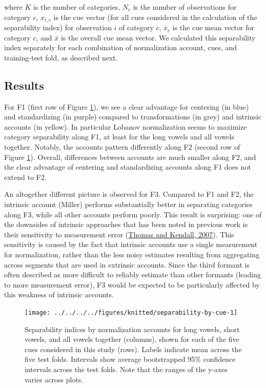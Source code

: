 \documentclass[utf8]{frontiers_suppmat} %
\begin{document}
where \(K\) is the number of categories, \(N_c\) is the number of observations for category \(c\), \(x_{i,c}\) is the cue vector (for all cues considered in the calculation of the separability index) for observation \(i\) of category \(c\), \(\bar{x}_c\) is the cue mean vector for category \(c\), and \(\bar{x}\) is the overall cue mean vector. We calculated this separability index separately for each combination of normalization account, cues, and training-test fold, as described next.


\hypertarget{sec:resultsI}{%
\subsection{Results}\label{sec:resultsI}}

For F1 (first row of Figure \ref{fig:separability-by-cue}), we see a clear advantage for centering (in blue) and standardizing (in purple) compared to transformations (in grey) and intrinsic accounts (in yellow). In particular Lobanov normalization seems to maximize category separability along F1, at least for the long vowels and all vowels together. Notably, the accounts pattern differently along F2 (second row of Figure \ref{fig:separability-by-cue}). Overall, differences between accounts are much smaller along F2, and the clear advantage of centering and standardizing accounts along F1 does not extend to F2.

An altogether different picture is observed for F3. Compared to F1 and F2, the intrinsic account (Miller) performs substantially better in separating categories along F3, while all other accounts perform poorly. This result is surprising: one of the downsides of intrinsic approaches that has been noted in previous work is their sensitivity to measurement error (\protect\hyperlink{ref-thomas2007}{Thomas and Kendall, 2007}). This sensitivity is caused by the fact that intrinsic accounts use a single measurement for normalization, rather than the less noisy estimates resulting from aggregating across segments that are used in extrinsic accounts. Since the third formant is often described as more difficult to reliably estimate than other formants (leading to more measurement error), F3 would be expected to be particularly affected by this weakness of intrinsic accounts.

\begin{figure}
{\centering \texttt{[image: ../../../../figures/knitted/separability-by-cue-1]} }
\caption{Separability indices by normalization accounts for long vowels, short vowels, and all vowels together (columns), shown for each of the five cues considered in this study (rows). Labels indicate mean across the five test folds. Intervals show average bootstrapped 95\% confidence intervals across the test folds. Note that the ranges of the y-axes varies across plots.}\label{fig:separability-by-cue}
\end{figure}
\end{document}
